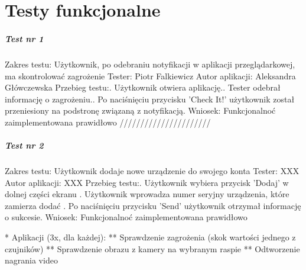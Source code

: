 \chapter{Testy funkcjonalne}


\paragraph{Test nr 1}
Zakres testu:\newline
Użytkownik, po odebraniu notyfikacji w aplikacji przeglądarkowej, ma skontrolować zagrożenie\newline
Tester: Piotr Falkiewicz\newline
Autor aplikacji: Aleksandra Główczewska\newline
Przebieg testu:. Użytkownik otwiera aplikację.. Tester odebrał informację o zagrożeniu.. Po naciśnięciu przycisku 'Check It!' użytkownik został przeniesiony na podstronę związaną z notyfikacją.\newline
Wniosek:\newline
Funkcjonalnoć zaimplementowana prawidłowo\newline
\newline
//////////////////////\newline
\paragraph{Test nr 2}
Zakres testu:\newline
Użytkownik dodaje nowe urządzenie do swojego konta\newline
Tester: XXX \newline
Autor aplikacji: XXX \newline
Przebieg testu:. Użytkownik wybiera przycisk 'Dodaj' w dolnej części ekranu . Użytkownik wprowadza numer seryjny urządzenia, które zamierza dodać . Po naciśnięciu przycisku 'Send' użytkownik otrzymał informację o sukcesie.\newline
Wniosek:\newline
Funkcjonalnoć zaimplementowana prawidłowo\newline

 
 
 
 * Aplikacji (3x, dla każdej):\newline
 ** Sprawdzenie zagrożenia (skok wartości jednego z czujników)\newline
 ** Sprawdzenie obrazu z kamery na wybranym raspie\newline
 ** Odtworzenie nagrania video\newline

